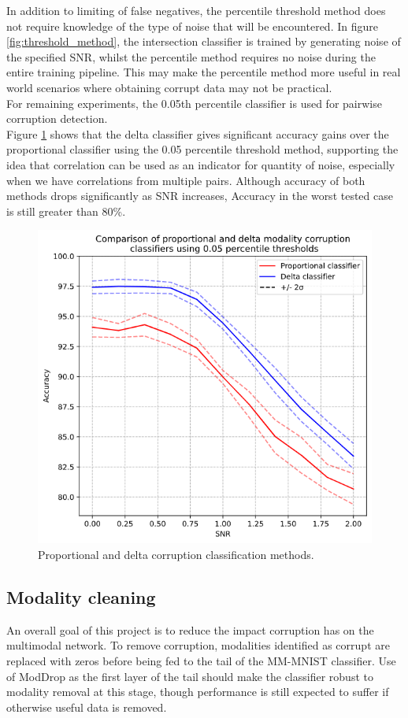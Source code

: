 In addition to limiting of false negatives, the percentile threshold method does not require knowledge of the type of noise that will be encountered. In figure \ref{fig:threshold_method}, the intersection classifier is trained by generating noise of the specified SNR, whilst the percentile method requires no noise during the entire training pipeline. This may make the percentile method more useful in real world scenarios where obtaining corrupt data may not be practical.\\

For remaining experiments, the 0.05th percentile classifier is used for pairwise corruption detection.\\

Figure \ref{fig:mod_classifiers} shows that the delta classifier gives significant accuracy gains over the proportional classifier using the 0.05 percentile threshold method, supporting the idea that correlation can be used as an indicator for quantity of noise, especially when we have correlations from multiple pairs. Although accuracy of both methods drops significantly as SNR increases, Accuracy in the worst tested case is still greater than 80\%.\\

\begin{figure}[H]
    \centering\captionsetup{width=.8\linewidth}
    \includegraphics[width=.6\textwidth]{images/modality_classifiers.png}
    \caption{Proportional and delta corruption classification methods.}
    \label{fig:mod_classifiers}
\end{figure}

\subsection{Modality cleaning}
An overall goal of this project is to reduce the impact corruption has on the multimodal network. To remove corruption, modalities identified as corrupt are replaced with zeros before being fed to the tail of the MM-MNIST classifier. Use of ModDrop as the first layer of the tail should make the classifier robust to modality removal at this stage, though performance is still expected to suffer if otherwise useful data is removed.\\


